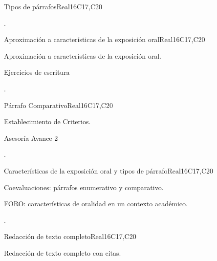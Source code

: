 \begin{syllabus}
\begin{unit}{Tipos de párrafos}{}{Real}{16}{C17,C20}
  \begin{learningoutcomes}
   \item .%
  \end{learningoutcomes}
\end{unit}

\begin{unit}{Aproximación a características de la exposición oral}{}{Real}{16}{C17,C20}
  \begin{topics}
      \item Aproximación a características de la exposición oral.
      \item Ejercicios de escritura
  \end{topics}

  \begin{learningoutcomes}
   \item .%
  \end{learningoutcomes}
\end{unit}

\begin{unit}{Párrafo Comparativo}{}{Real}{16}{C17,C20}
  \begin{topics}
      \item Establecimiento de Criterios.
      \item Asesoría Avance 2 
  \end{topics}

  \begin{learningoutcomes}
   \item .%
  \end{learningoutcomes}
\end{unit}

\begin{unit}{Características de la exposición oral y tipos de párrafo}{}{Real}{16}{C17,C20}
  \begin{topics}
      \item Coevaluaciones: párrafos enumerativo y comparativo.
      \item FORO: características de oralidad en un contexto académico.
  \end{topics}

  \begin{learningoutcomes}
   \item .%
  \end{learningoutcomes}
\end{unit}

\begin{unit}{Redacción de texto completo}{}{Real}{16}{C17,C20}
  \begin{topics}
      \item Redacción de texto completo con citas.
  \end{topics}


\end{unit}
\end{syllabus}
